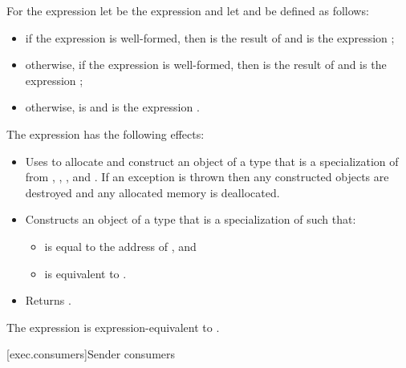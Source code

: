 \pnum
For the expression 
let  be the expression  and
let  and  be defined as follows:
\begin{itemize}
\item
if the expression  is well-formed, then
 is the result of  and
 is the expression ;
\item
otherwise,
if the expression  is well-formed, then
 is the result of  and
 is the expression
;
\item
otherwise,
 is  and
 is the expression .
\end{itemize}

\pnum
The expression 
has the following effects:

\begin{itemize}
\item
Uses  to allocate and construct an object  of
a type that is a specialization of 
from , , , and .
If an exception is thrown then
any constructed objects are destroyed and
any allocated memory is deallocated.

\item
Constructs an object  of
a type that is a specialization of  such that:
  \begin{itemize}
  \item
   is equal to the address of , and
  \item
   is equivalent to
  .
  \end{itemize}

\item
Returns .
\end{itemize}

\pnum
The expression  is expression-equivalent to
.

[exec.consumers]{Sender consumers}

